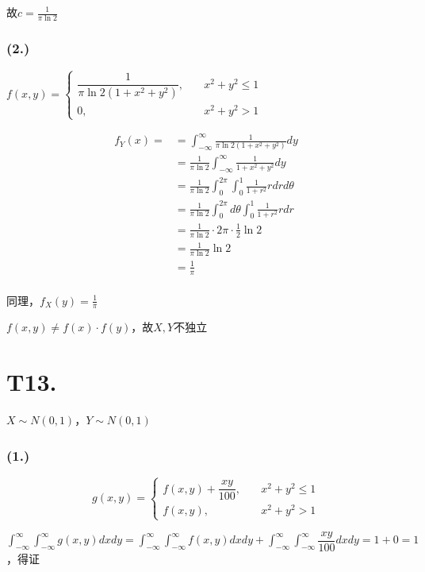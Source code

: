 \documentclass{article}
\newcommand\f[2]{\frac{#1}{#2}}
\newcommand\df[2]{\dfrac{#1}{#2}}
\begin{document}
故$c=\f{1}{\pi\ln2}$

\subsubsection*{(2.)}

$f(x,y)=
\begin{cases}
    \df{1}{\pi\ln2(1+x^2+y^2)}, &\quad x^2+y^2\leq1\\
    0, &\quad x^2+y^2>1
\end{cases}
$

\begin{equation}
    \begin{aligned}
        f_Y(x)=
        & =\int_{-\infty}^{\infty}\f{1}{\pi\ln2(1+x^2+y^2)}dy\\
        & =\f{1}{\pi\ln2}\int_{-\infty}^{\infty}\f{1}{1+x^2+y^2}dy\\
        & =\f{1}{\pi\ln2}\int_{0}^{2\pi}\int_{0}^{1}\f{1}{1+r^2}rdrd\theta\\
        & =\f{1}{\pi\ln2}\int_{0}^{2\pi}d\theta\int_{0}^{1}\f{1}{1+r^2}rdr\\
        & =\f{1}{\pi\ln2}\cdot2\pi\cdot\f{1}{2}\ln2\\
        & =\f{1}{\pi\ln2}\ln2\\
        & =\f{1}{\pi}\\
    \end{aligned}
\end{equation}

同理，$f_X(y)=\f{1}{\pi}$

$f(x,y)\neq f(x)\cdot f(y)$，故$X,Y$不独立

\section*{T13. }

$X \sim N(0,1)$，$Y \sim N(0,1)$

\subsubsection*{(1.)}

$$g(x,y)=
\begin{cases}
    f(x,y)+\df{xy}{100}, &\quad x^2+y^2\leq1\\
    f(x,y), &\quad x^2+y^2>1
\end{cases}
$$

$\int_{-\infty}^{\infty}\int_{-\infty}^{\infty}g(x,y)dxdy=\int_{-\infty}^{\infty}\int_{-\infty}^{\infty}f(x,y)dxdy+\int_{-\infty}^{\infty}\int_{-\infty}^{\infty}\df{xy}{100}dxdy=1+0=1$，得证
\end{document}
